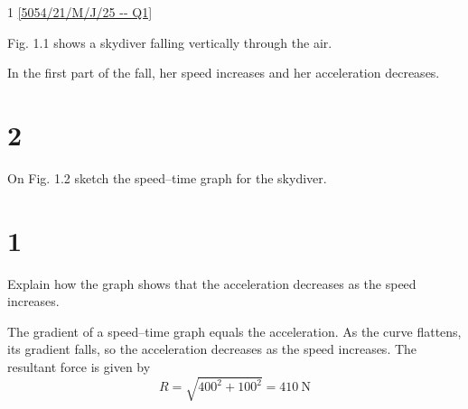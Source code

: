 \documentclass[11pt]{article}
\begin{document}
\subject{Physics}

\begin{question}{1}
\ref{5054/21/M/J/25 -- Q1}

\qtext
Fig. 1.1 shows a skydiver falling vertically through the air.


In the first part of the fall, her speed increases and her acceleration decreases.

\part{2} On Fig. 1.2 sketch the speed--time graph for the skydiver.

\part{1} Explain how the graph shows that the acceleration decreases as the speed increases.
\endq

\markscheme
{}
\endms

\exemplar
The gradient of a speed--time graph equals the acceleration. As the curve
flattens, its gradient falls, so the acceleration decreases as the speed
increases. The resultant force is given by
$$ R = \sqrt{400^{2} + 100^{2}} = 410\ \text{N} $$
\endexemplar
\end{question}
\end{document}
